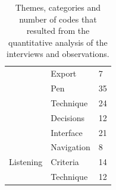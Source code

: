 \begin{table}[h]
{\begin{tabular}{|l|l|l|}
& Export & 7 \\ \cline{2-3} %
& Pen & 35 \\ \cline{2-3} %
& Technique & 24 \\ \cline{2-3} %
& Decisions & 12 \\ \cline{2-3} %
 & Interface & 21 \\ \hline %
\multirow{3}{*}{Listening}
& Navigation & 8 \\ \cline{2-3} %
& Criteria & 14 \\ \cline{2-3} %
 & Technique & 12 \\ \hline %

\end{tabular}
}
\caption{Themes, categories and number of codes that resulted from the quantitative analysis of the interviews and
observations.}
\label{tab:paper-codes}
\end{table}

